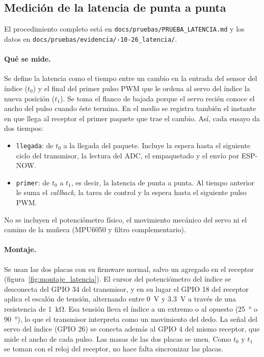 \subsection{Medición de la latencia de punta a punta}
\label{sec:latencia_medida}

El procedimiento completo está en \texttt{docs/\allowbreak pruebas/\allowbreak PRUEBA\_LATENCIA.md} y los datos en \texttt{docs/\allowbreak pruebas/\allowbreak evidencia/-10-26\_latencia/}.

\paragraph{Qué se mide.} Se define la latencia como el tiempo entre un cambio en la entrada del sensor del índice ($t_0$) y el final del primer pulso PWM que le ordena al servo del índice la nueva posición ($t_1$). Se toma el flanco de bajada porque el servo recién conoce el ancho del pulso cuando éste termina. En el medio se registra también el instante en que llega al receptor el primer paquete que trae el cambio. Así, cada ensayo da dos tiempos:
\begin{itemize}
    \item \texttt{llegada}: de $t_0$ a la llegada del paquete. Incluye la espera hasta el siguiente ciclo del transmisor, la lectura del ADC, el empaquetado y el envío por ESP-NOW.
    \item \texttt{primer}: de $t_0$ a $t_1$, es decir, la latencia de punta a punta. Al tiempo anterior le suma el \textit{callback}, la tarea de control y la espera hasta el siguiente pulso PWM.
\end{itemize}
No se incluyen el potenciómetro físico, el movimiento mecánico del servo ni el camino de la muñeca (MPU6050 y filtro complementario).

\paragraph{Montaje.} Se usan las dos placas con su firmware normal, salvo un agregado en el receptor (figura~\ref{fig:montaje_latencia}). El cursor del potenciómetro del índice se desconecta del GPIO 34 del transmisor, y en su lugar el GPIO 18 del receptor aplica el escalón de tensión, alternando entre \SI{0}{\volt} y \SI{3.3}{\volt} a través de una resistencia de \SI{1}{\kilo\ohm}. Esa tensión lleva el índice a un extremo o al opuesto (\SI{25}{\degree} o \SI{90}{\degree}), lo que el transmisor interpreta como un movimiento del dedo. La señal del servo del índice (GPIO 26) se conecta además al GPIO 4 del mismo receptor, que mide el ancho de cada pulso. Las masas de las dos placas se unen. Como $t_0$ y $t_1$ se toman con el reloj del receptor, no hace falta sincronizar las placas.

